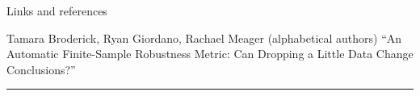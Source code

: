 \begin{frame}{Links and references}

\footnotesize

Tamara Broderick, Ryan Giordano, Rachael Meager (alphabetical authors) \newline
``An Automatic Finite-Sample Robustness Metric: Can Dropping a Little Data Change Conclusions?''
%


%
%

\par\noindent\rule{\textwidth}{0.4pt}



\begingroup
\renewcommand{\section}[2]{}%
{
\tiny

}
\endgroup

\end{frame}

